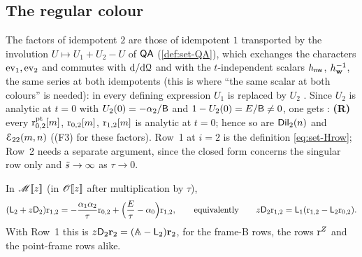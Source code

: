 
\subsection{The regular colour}
\label{sec:lea-regular}

The factors of idempotent $2$ are those of idempotent $1$ transported by the involution $U\mapsto U_1+U_2-U$ of $\mathsf{QA}$ (\cref{def:set-QA}), which exchanges the characters $\operatorname{ev}_1,\operatorname{ev}_2$ and commutes with $\mathrm{d}/\mathrm{d}\mathcal{Q}$ and with the $t$-independent scalars $h_{\mathsf{nw}}$, $h_{\mathbf{w}}^{-1}$, the same series at both idempotents (this is where ``the same scalar at both colours'' is needed): in every defining expression $U_1$ is replaced by $U_2$ . Since $U_2$ is analytic at $t=0$ with $U_2(0)=-\alpha_2/\mathsf{B}$ and $1-U_2(0)=E/\mathsf{B}\neq0$, one gets : \textbf{(R)} every $\mathrm{r}^{\mathrm{pt}}_{0,2}[m]$, $\mathrm{r}_{0,2}[m]$, $\mathrm{r}_{1,2}[m]$ is analytic at $t=0$; hence so are $\mathsf{Dil}_2(n)$ and $\mathcal{E}_{22}(m,n)$ ((F3) for these factors). Row~1 at $i=2$ is the definition \eqref{eq:set-Hrow}; Row~2 needs a separate argument, since the closed form concerns the singular row only and $\tilde{s}\to\infty$ as $\tau\to0$.

\begin{thm}
\label{thm:lea-row2reg}
In $\mathscr{M}[\![ z ]\!]$ (in $\mathscr{O}[\![ z ]\!]$ after multiplication by $\tau$),
\[
(\mathsf{L}_2+z\mathsf{D}_2)\mathrm{r}_{1,2}=-\frac{\alpha_1\alpha_2}{\tau}\mathrm{r}_{0,2}+\Bigl(\frac E\tau-\alpha_0\Bigr)\mathrm{r}_{1,2},\qquad\text{equivalently}\qquad z\mathsf{D}_2\mathrm{r}_{1,2}=\mathsf{L}_1(\mathrm{r}_{1,2}-\mathsf{L}_2\mathrm{r}_{0,2}).
\]
With Row~1 this is $z\mathsf{D}_2\mathbf{r}_2=(\mathbb{A}-\mathsf{L}_2)\mathbf{r}_2$, for the frame-B rows, the rows $\mathrm{r}^{Z}$ and the point-frame rows alike.
\end{thm}

